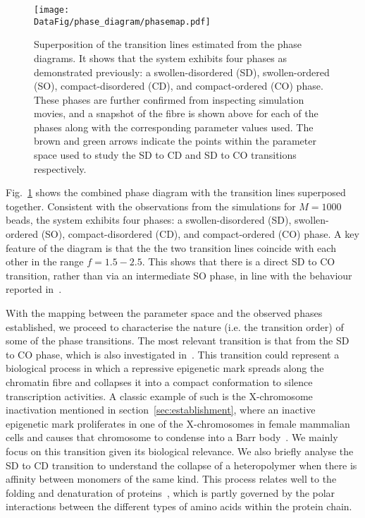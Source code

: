 \documentclass[12pt]{article}
\newcommand*{\DataFig}{/Users/MichaelChiang/Desktop/epigenetics_data/}
\begin{document}
\begin{figure}[t]
\texttt{[image: \\DataFig/phase\_diagram/phasemap.pdf]}
\caption{Superposition of the transition lines estimated from the phase diagrams. It shows that the system exhibits four phases as demonstrated previously: a swollen-disordered (SD), swollen-ordered (SO), compact-disordered (CD), and compact-ordered (CO) phase. These phases are further confirmed from inspecting simulation movies, and a snapshot of the fibre is shown above for each of the phases along with the corresponding parameter values used. The brown and green arrows indicate the points within the parameter space used to study the SD to CD and SD to CO transitions respectively.}
\label{fig:phasemap}
\end{figure}

Fig.~\ref{fig:phasemap} shows the combined phase diagram with the transition lines superposed together.  Consistent with the observations from the simulations for $M = 1000$ beads, the system exhibits four phases: a swollen-disordered (SD), swollen-ordered (SO), compact-disordered (CD), and compact-ordered (CO) phase. A key feature of the diagram is that the the two transition lines coincide with each other in the range $f = 1.5 - 2.5$. This shows that there is a direct SD to CO transition, rather than via an intermediate SO phase, in line with the behaviour reported in~\cite{michieletto2016}. 

With the mapping between the parameter space and the observed phases established, we proceed to characterise the nature (i.e. the transition order) of some of the phase transitions. The most relevant transition is that from the SD to CO phase, which is also investigated in~\cite{michieletto2016}. This transition could represent a biological process in which a repressive epigenetic mark spreads along the chromatin fibre and collapses it into a compact conformation to silence transcription activities. A classic example of such is the X-chromosome inactivation mentioned in section~\ref{sec:establishment}, where an inactive epigenetic mark proliferates in one of the X-chromosomes in female mammalian cells and causes that chromosome to condense into a Barr body~\cite{avner2001}. We mainly focus on this transition given its biological relevance. We also briefly analyse the SD to CD transition to understand the collapse of a heteropolymer when there is affinity between monomers of the same kind. This process relates well to the folding and denaturation of proteins~\cite{}, which is partly governed by the polar interactions between the different types of amino acids within the protein chain.
\end{document}

